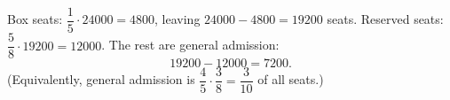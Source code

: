 Box seats: $\dfrac{1}{5}\cdot24000=4800$, leaving $24000-4800=19200$ seats. Reserved seats: $\dfrac{5}{8}\cdot19200=12000$. The rest are general admission:
\[
19200-12000=\boxed{7200}.
\]
(Equivalently, general admission is $\dfrac{4}{5}\cdot\dfrac{3}{8}=\dfrac{3}{10}$ of all seats.)
